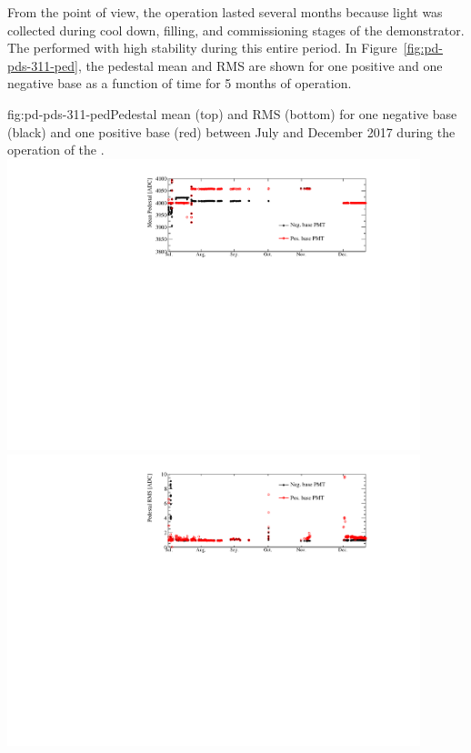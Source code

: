 From the  point of view, the  operation lasted several months because light was collected during cool down, filling, and commissioning stages of the demonstrator.
The  performed with high stability during this entire period. 
In Figure~\ref{fig:pd-pds-311-ped}, the  pedestal mean and RMS are shown for one positive and one negative base  as a function of time for \num{5} months of operation. 

\begin{dunefigure}{fig:pd-pds-311-ped}{Pedestal mean (top) and RMS (bottom) for one negative base  (black) and one positive base  (red) between July and December 2017 during the operation of the .}
\includegraphics[width=0.9\textwidth]{graphics/dppd_311_pedestal.pdf}\\
\includegraphics[width=0.9\textwidth]{graphics/dppd_311_pedestal_rms.pdf}
\end{dunefigure}

